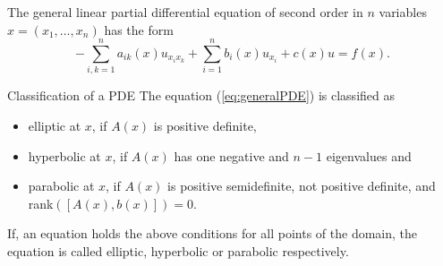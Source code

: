 
\begin{defn}{\quad}
	The general linear partial differential equation of second order in $n$ variables $x=(x_1,\ldots,x_n)$ has the form
	\begin{equation}
		-\sum_{ i, k = 1 }^n a_{ ik } (x) u_{ x_i x_k } + \sum_{ i = 1 }^n b_i (x) u_{ x_i } + c (x) u = f (x).
		\label{eq:generalPDE}
	\end{equation}
\end{defn}

\begin{defn}{Classification of a PDE}
	The equation (\ref{eq:generalPDE}) is classified as
		\begin{itemize}
			\item elliptic at $x$, if $A(x)$ is positive definite,
			\item hyperbolic at $x$, if $A(x)$ has one negative and $n-1$ eigenvalues and
			\item parabolic at $x$, if $A(x)$ is positive semidefinite, not positive definite, and rank$([A(x), b(x)])=0$.  
		\end{itemize}
	
	If, an equation holds the above conditions for all points of the domain, the equation is called elliptic, hyperbolic or parabolic respectively. 
	\end{defn}